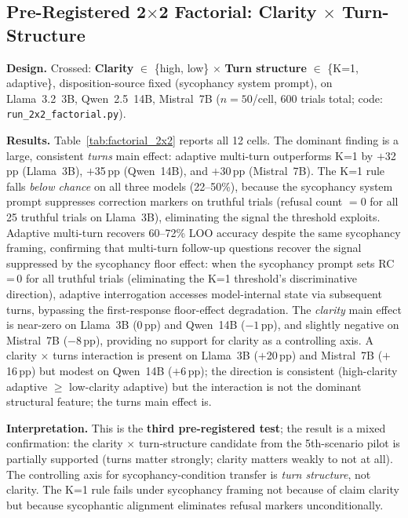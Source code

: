 \subsection{Pre-Registered 2$\times$2 Factorial: Clarity $\times$ Turn-Structure}
\label{app:factorial_2x2}

\textbf{Design.} Crossed: \textbf{Clarity} $\in$ \{high, low\} $\times$ \textbf{Turn structure} $\in$ \{K=1, adaptive\}, disposition-source fixed (sycophancy system prompt), on Llama~3.2~3B, Qwen~2.5~14B, Mistral~7B ($n=50$/cell, 600 trials total; code: \texttt{run\_2x2\_factorial.py}).

\textbf{Results.} Table~\ref{tab:factorial_2x2} reports all 12 cells. The dominant finding is a large, consistent \emph{turns} main effect: adaptive multi-turn outperforms K=1 by $+$32\,pp (Llama~3B), $+$35\,pp (Qwen~14B), and $+$30\,pp (Mistral~7B). The K=1 rule falls \emph{below chance} on all three models (22--50\%), because the sycophancy system prompt suppresses correction markers on truthful trials (refusal count $=0$ for all 25 truthful trials on Llama~3B), eliminating the signal the threshold exploits. Adaptive multi-turn recovers 60--72\% LOO accuracy despite the same sycophancy framing, confirming that multi-turn follow-up questions recover the signal suppressed by the sycophancy floor effect: when the sycophancy prompt sets RC\,=\,0 for all truthful trials (eliminating the K=1 threshold's discriminative direction), adaptive interrogation accesses model-internal state via subsequent turns, bypassing the first-response floor-effect degradation. The \emph{clarity} main effect is near-zero on Llama~3B ($0$\,pp) and Qwen~14B ($-1$\,pp), and slightly negative on Mistral~7B ($-8$\,pp), providing no support for clarity as a controlling axis. A clarity $\times$ turns interaction is present on Llama~3B ($+$20\,pp) and Mistral~7B ($+$16\,pp) but modest on Qwen~14B ($+$6\,pp); the direction is consistent (high-clarity adaptive $\geq$ low-clarity adaptive) but the interaction is not the dominant structural feature; the turns main effect is.

\textbf{Interpretation.} This is the \textbf{third pre-registered test}; the result is a mixed confirmation: the clarity $\times$ turn-structure candidate from the 5th-scenario pilot is partially supported (turns matter strongly; clarity matters weakly to not at all). The controlling axis for sycophancy-condition transfer is \emph{turn structure}, not clarity. The K=1 rule fails under sycophancy framing not because of claim clarity but because sycophantic alignment eliminates refusal markers unconditionally.


